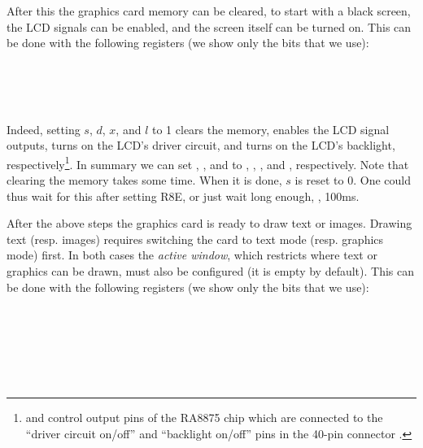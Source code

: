 After this the graphics card memory can be cleared, to start with a black
screen, the LCD signals can be enabled, and the screen itself can be
turned on. This can be done with the following registers (we show only the bits
that we use):

\begin{Paragraph}
\\
\\
\\
\end{Paragraph}


Indeed, setting $s$, $d$, $x$, and $l$ to 1 clears the memory, enables the LCD
signal outputs, turns on the LCD's driver circuit, and turns on the LCD's
backlight, respectively\footnote{ and
 control output pins of the RA8875 chip which are
connected to the ``driver circuit on/off'' and ``backlight on/off'' pins in the
40-pin connector \cite{RA8875board}.}. In summary we can set
, ,  and
 to , ,
, and , respectively. Note that clearing
the memory takes some time. When it is done, $s$ is reset to 0. One could thus
wait for this after setting R8E, or just wait long enough, \eg, 100ms.

After the above steps the graphics card is ready to draw text or images.
Drawing text (resp. images) requires switching the card to text mode (resp.
graphics mode) first. In both cases the {\em active window}, which restricts
where text or graphics can be drawn, must also be configured (it is empty by
default). This can be done with the following registers (we show only the bits
that we use):

\begin{Paragraph}
\\
\\
\\
\\
\\
\end{Paragraph}

